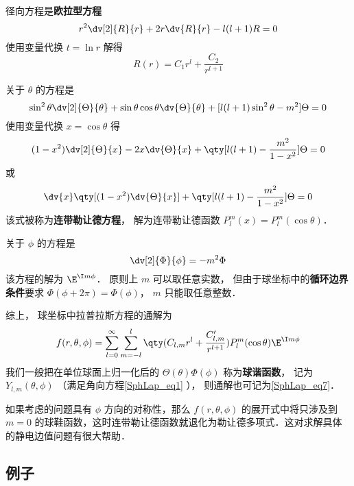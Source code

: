 径向方程是\textbf{欧拉型方程}
\begin{equation}
r^2\dv[2]{R}{r} + 2r\dv{R}{r} - l(l+1)R = 0
\end{equation}
使用变量代换 $t = \ln r$ 解得
\begin{equation}
R(r) = C_1 r^l + \frac{C_2}{r^{l+1}}
\end{equation}

关于 $\theta$ 的方程是
\begin{equation}
\sin^2\theta \dv[2]{\Theta}{\theta} + \sin\theta\cos\theta\dv{\Theta}{\theta} + [l(l+1)\sin^2\theta - m^2] \Theta = 0
\end{equation}
使用变量代换 $x = \cos\theta$ 得
\begin{equation}
(1-x^2)\dv[2]{\Theta}{x} - 2x\dv{\Theta}{x} + \qty[l(l+1) - \frac{m^2}{1-x^2}]\Theta = 0
\end{equation}
或
\begin{equation}
\dv{x} \qty[(1-x^2)\dv{\Theta}{x}] + \qty[l(l+1) - \frac{m^2}{1-x^2}]\Theta = 0
\end{equation}
该式被称为\textbf{连带勒让德方程}， 解为连带勒让德函数 $P_l^m(x) = P_l^m(\cos\theta)$．

关于 $\phi$ 的方程是
\begin{equation}
\dv[2]{\Phi}{\phi} = -m^2 \Phi
\end{equation}
该方程的解为 $\E^{\I m\phi}$． 原则上 $m$ 可以取任意实数， 但由于球坐标中的\textbf{循环边界条件}要求 $\Phi(\phi + 2\pi) = \Phi(\phi)$， $m$ 只能取任意整数．

综上， 球坐标中拉普拉斯方程的通解为
\begin{equation}\label{SphLap_eq6}
f(r, \theta, \phi) = \sum_{l = 0}^\infty \sum_{m = -l}^l \qty(C_{l,m} r^l + \frac{C'_{l,m}}{r^{l+1}})P_l^m(\cos\theta)\E^{\I m\phi}
\end{equation}
我们一般把在单位球面上归一化后的 $\Theta(\theta)\Phi(\phi)$ 称为\textbf{球谐函数}， 记为 $Y_{l,m}(\theta,\phi)$ （满足角向方程\autoref{SphLap_eq1} ）， 则通解也可记为\autoref{SphLap_eq7}．

如果考虑的问题具有 $\phi$ 方向的对称性，那么 $f(r,\theta,\phi)$ 的展开式中将只涉及到 $m=0$ 的球鞋函数，这时连带勒让德函数就退化为勒让德多项式．这对求解具体的静电边值问题有很大帮助．

\subsection{例子}


